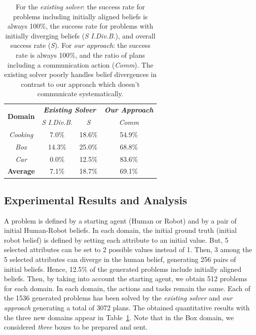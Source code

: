 \documentclass[letterpaper]{article} %
\begin{document}
\begin{table}
    \begin{adjustbox}{width=0.77\columnwidth,center}
    \begin{tabular}{@{}c|c c| c@{}}
        \multirow{2}{*}{\textbf{Domain}} & \multicolumn{2}{c|}{\textbf{\textit{Existing Solver}}} & \multicolumn{1}{c}{\textbf{\textit{Our Approach}}}
        \\
        & \multicolumn{1}{c}{\textit{S I.Div.B.}} & \multicolumn{1}{c|}{\textit{S}} & \multicolumn{1}{c}{\textit{Comm}} 
        \\ \cline{1-4}
        \textit{Cooking}    &  7.0\% & 18.6\% & 54.9\%\\
        \textit{Box}        & 14.3\% & 25.0\% & 68.8\%\\
        \textit{Car}        &  0.0\% & 12.5\% & 83.6\%\\
        \hline
        \textbf{Average}    &  7.1\% & 18.7\% & 69.1\%\\
    \end{tabular}
    \end{adjustbox}
    \caption
    {
    \label{tab:q_results}
    For the \textit{existing solver}: the success rate for problems including initially aligned beliefs is always 100\%, the success rate for problems with initially diverging beliefs (\textit{S I.Div.B.}), and overall success rate (\textit{S}). For \textit{our approach}: the success rate is always 100\%, and the ratio of plans including a communication action (\textit{Comm}). 
    The existing solver poorly handles belief divergences in contrast to our approach which doesn't communicate systematically.
    }
\end{table}

\subsection{Experimental Results and Analysis}

A problem is defined by a starting agent (Human or Robot) and by a pair of initial Human-Robot beliefs. In each domain, the initial ground truth (initial robot belief) is defined by setting each attribute to an initial value. But, 5 selected attributes can be set to 2 possible values instead of 1. Then, 3 among the 5 selected attributes can diverge in the human belief, generating 256 pairs of initial beliefs. Hence, 12.5\% of the generated problems include initially aligned beliefs. Then, by taking into account the starting agent, we obtain 512 problems for each domain. In each domain, the actions and tasks remain the same. 
Each of the 1536 generated problems has been solved by the \textit{existing solver} and \textit{our approach} generating a total of 3072 plans. The obtained quantitative results with the three new domains appear in Table~\ref{tab:q_results}. Note that in the Box domain, we considered \textit{three} boxes to be prepared and sent. 
\end{document}
